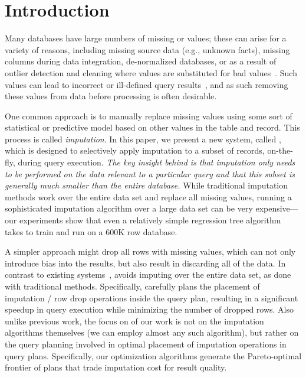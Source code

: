 \section{Introduction}

Many databases have large numbers of missing or \nullv{} values;  these can arise for a variety of reasons, including missing source data (e.g., unknown facts),
missing columns during data integration, de-normalized databases, or as a result of outlier detection and cleaning where \nullv{} values are substituted for
bad values~\cite{kim2003}.  Such \nullv{} values can lead to incorrect or ill-defined query results~\cite{rubin1976}, and as such removing these values from data
before processing is often desirable.

One common approach is to manually replace missing values using some sort of statistical or predictive model based on other values in the table and record.
This process is called \emph{imputation}.
In this paper, we present a new system, called \ProjectName{}, which is designed to selectively apply imputation to a subset of records, on-the-fly, during query execution.  \emph{The key insight behind \ProjectName{} is that imputation
only needs to be performed on the data relevant to a particular query and
that this subset is generally much smaller than the entire database.}  
While traditional imputation methods work over the entire data set and replace all missing values, running a sophisticated imputation algorithm over a large data set can be very expensive---our experiments show that even a relatively simple regression tree algorithm takes \acsbaseresulthours{} to train and run
on a 600K row database.

A simpler approach might drop all rows with missing values, which can not only introduce bias into the results, but also result in discarding all of the data.
In contrast to existing systems~\cite{burgette2010multiple,akande2015empirical}, \ProjectName{} avoids imputing over the entire data set, as done with traditional methods. Specifically, \ProjectName{}
carefully plans the placement of imputation / row drop operations inside the query plan, resulting in a 
significant speedup in query execution while minimizing the number of dropped rows.  Also unlike previous work, the focus on of our work is not on the imputation algorithms themselves (we can employ almost any such algorithm), but rather on the  query planning involved in optimal placement of imputation operations
in query plans.   Specifically, our optimization algorithms generate the Pareto-optimal frontier of plans that trade imputation cost for result quality.

